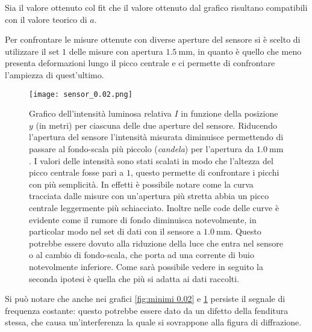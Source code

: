 \documentclass[../main.tex]{subfiles}
\begin{document}
Sia il valore ottenuto col fit che il valore ottenuto dal grafico risultano compatibili con il valore teorico di $a$.

Per confrontare le misure ottenute con diverse aperture del sensore si è scelto di utilizzare il set $1$ delle misure con apertura $\qty{1.5}{\mm}$, in quanto è quello che meno presenta deformazioni lungo il picco centrale e ci permette di confrontare l'ampiezza di quest'ultimo.

\begin{figure}[ht!]
    \centering
    \texttt{[image: sensor\_0.02.png]}
    \caption{Grafico dell'intensità luminosa relativa $I$ in funzione della posizione $y$ (in metri) per ciascuna delle due aperture del sensore.
        Riducendo l'apertura del sensore l'intensità misurata diminuisce permettendo di passare al fondo-scala più piccolo (\textit{candela}) per l'apertura da $\qty{1.0}{\mm}$.
        I valori delle intensità sono stati scalati in modo che l'altezza del picco centrale fosse pari a $1$, questo permette di confrontare i picchi con più semplicità. In effetti è possibile notare come la curva tracciata dalle misure con un'apertura più stretta abbia un picco centrale leggermente più schiacciato.
        Inoltre nelle code delle curve è evidente come il rumore di fondo diminuisca notevolmente, in particolar modo nel set di dati con il sensore a $\qty{1.0}{\mm}$. Questo potrebbe essere dovuto alla riduzione della luce che entra nel sensore o al cambio di fondo-scala, che porta ad una corrente di buio notevolmente inferiore.
        Come sarà possibile vedere in seguito la seconda ipotesi è quella che più si adatta ai dati raccolti.} %
    \label{fig:sensore 0.02}
\end{figure}

Si può notare che anche nei grafici \ref{fig:minimi 0.02} e \ref{fig:sensore 0.02} persiste il segnale di frequenza costante: questo potrebbe essere dato da un difetto della fenditura stessa, che causa un'interferenza la quale si sovrappone alla figura di diffrazione.
\end{document}

